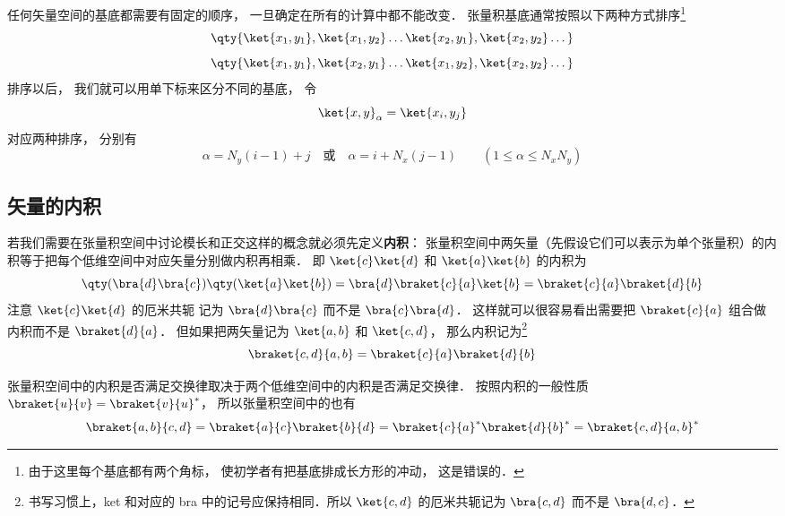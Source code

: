 任何矢量空间的基底都需要有固定的顺序， 一旦确定在所有的计算中都不能改变． 张量积基底通常按照以下两种方式排序\footnote{由于这里每个基底都有两个角标， 使初学者有把基底排成长方形的冲动， 这是错误的．}
\begin{equation}\label{DirPro_eq4}
\qty{\ket{x_1, y_1}, \ket{x_1, y_2}\dots  \ket{x_2, y_1}, \ket{x_2, y_2}\dots }
\end{equation}
\begin{equation}\label{DirPro_eq5}
\qty{\ket{x_1, y_1}, \ket{x_2, y_1}\dots  \ket{x_1, y_2}, \ket{x_2, y_2}\dots }
\end{equation}
排序以后， 我们就可以用单下标来区分不同的基底， 令
\begin{equation}
\ket{x, y}_\alpha = \ket{x_i, y_j}
\end{equation}
对应两种排序， 分别有
\begin{equation}
\alpha = N_y (i-1) + j
\quad \text{或} \quad
\alpha = i + N_x (j-1)
\qquad 
(1 \leqslant \alpha \leqslant N_xN_y)
\end{equation}

\subsection{矢量的内积}

若我们需要在张量积空间中讨论模长和正交这样的概念就必须先定义\textbf{内积}： 张量积空间中两矢量（先假设它们可以表示为单个张量积）的内积等于把每个低维空间中对应矢量分别做内积再相乘． 即 $\ket{c}\ket{d}$ 和 $\ket{a}\ket{b}$ 的内积为
\begin{equation}
\qty(\bra{d}\bra{c})\qty(\ket{a}\ket{b})
= \bra{d}\braket{c}{a}\ket{b}
= \braket{c}{a}\braket{d}{b}
\end{equation}
注意 $\ket{c}\ket{d}$ 的厄米共轭%
记为 $\bra{d}\bra{c}$ 而不是 $\bra{c}\bra{d}$． 这样就可以很容易看出需要把 $\braket{c}{a}$ 组合做内积而不是 $\braket{d}{a}$． 但如果把两矢量记为 $\ket{a, b}$ 和 $\ket{c, d}$， 那么内积记为\footnote{书写习惯上，ket 和对应的 bra 中的记号应保持相同．所以 $\ket{c, d}$ 的厄米共轭记为 $\bra{c, d}$ 而不是 $\bra{d, c}$．}
\begin{equation}
\braket{c, d}{a, b} = \braket{c}{a}\braket{d}{b}
\end{equation}

张量积空间中的内积是否满足交换律取决于两个低维空间中的内积是否满足交换律． 按照内积的一般性质 $\braket{u}{v} = \braket{v}{u}^*$， 所以张量积空间中的也有
\begin{equation}
\braket{a, b}{c, d} = \braket{a}{c}\braket{b}{d}
= \braket{c}{a}^*\braket{d}{b}^* = \braket{c, d}{a, b}^*
\end{equation}

